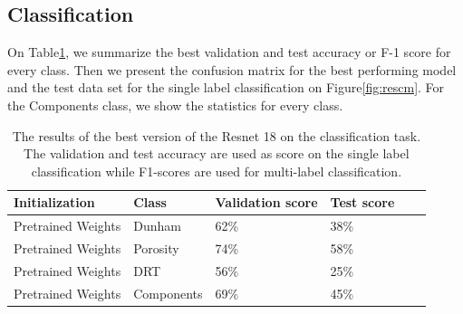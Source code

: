 \subsection{Classification}
On Table\ref{tab:resbest}, we summarize the best validation and test accuracy or F-1 score for every class. Then we present the confusion matrix for the best performing model and the test data set for the single label classification on Figure\ref{fig:rescm}. For the Components class, we show the statistics for every class. 

\begin{table}
\caption{\label{tab:resbest} The results of the best version of the Resnet 18 on the classification task. The validation and test accuracy are used as score on the single label classification while F1-scores are used for multi-label classification.}
\centering
\begin{tabular}[b]{| l | l | l | l | l |}
\hline
    Initialization & Class & Validation score & Test score \ \\ \hline
    Pretrained Weights & Dunham &  62\%  & 38\% \\ \hline
    Pretrained Weights & Porosity & 74\%  &  58\% \\ \hline
    Pretrained Weights &DRT & 56\% &  25\% \\ \hline
    Pretrained Weights &Components & 69\% &  45\% \\ \hline
\end{tabular} 
\end{table}

